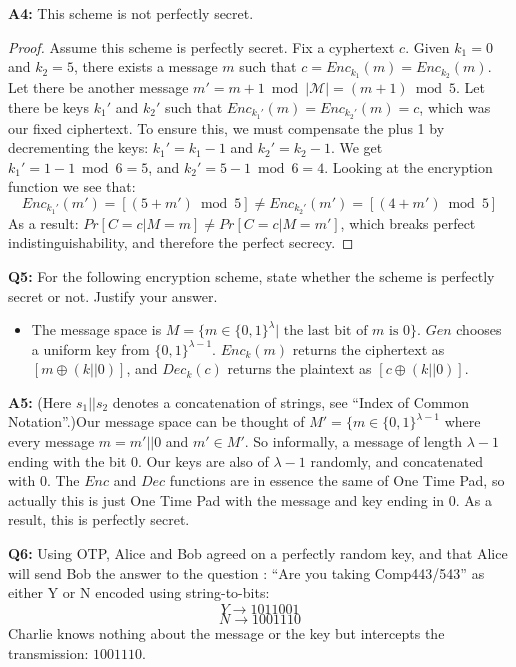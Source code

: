 \documentclass[12pt,reqno]{amsart}
\begin{document}
\textbf{A4:} This scheme is not perfectly secret.
\begin{proof}
Assume this scheme is perfectly secret. Fix a cyphertext $c$. Given $k_1=0$ and $k_2=5$, there exists a message $m$ such that $c=Enc_{k_1}(m)=Enc_{k_2}(m)$. Let there be another message $m' = m + 1 \bmod |\mathcal{M}| = (m+1) \bmod 5$. Let there be keys $k_1'$ and $k_2'$ such that $Enc_{k_1'}(m)=Enc_{k_2'}(m)=c$, which was our fixed ciphertext. To ensure this, we must compensate the plus 1 by decrementing the keys: $k_1'=k_1-1$ and $k_2'=k_2-1$. We get $k_1'=1-1 \bmod 6 = 5$, and $k_2'=5-1 \bmod 6 = 4$. Looking at the encryption function we see that:
$$
Enc_{k_1'}(m')=[(5+m') \bmod 5] \ne Enc_{k_2'}(m') = [(4 + m') \bmod 5]
$$
As a result: $Pr[C=c|M=m] \ne Pr[C=c|M=m']$, which breaks perfect indistinguishability, and therefore the perfect secrecy.
\end{proof}

\vspace{20px}
\textbf{Q5:}   For the following encryption scheme, state whether the scheme is perfectly secret  or  not. Justify your answer.
\begin{itemize}
\item The message space is $M = \{m \in \{0, 1\}^{\lambda} |  \text{ the last bit of $m$ is 0}\}$. $Gen$ chooses a uniform key from $\{0, 1\}^{\lambda-1}$. $Enc_k(m)$ returns the ciphertext as $[m \oplus (k || 0) ]$, and $Dec_k(c)$ returns the plaintext as     $[c \oplus (k||0)]$. 
\end{itemize}
\textbf{A5:} (Here $s_1||s_2$ denotes a concatenation of strings, see ``Index of Common Notation''.)Our message space can be thought of $M'= \{m \in \{0, 1\}^{\lambda-1}$ where every message $m = m'||0$ and $m' \in M'$. So informally, a message of length $\lambda-1$ ending with the bit 0. Our keys are also of $\lambda-1$ randomly, and concatenated with 0. The $Enc$ and $Dec$ functions are in essence the same of One Time Pad, so actually this is just One Time Pad with the message and key ending in 0. As a result, this is perfectly secret.

\vspace{20px}
\textbf{Q6:} Using OTP, Alice   and   Bob   agreed   on   a   perfectly   random   key,  and that Alice will send Bob the answer to the question : ``Are you taking Comp443/543'' as either Y   or N encoded using string-to-bits:
$$
Y \xrightarrow{} 1011001
$$
$$
N \xrightarrow{} 1001110
$$
Charlie knows nothing about the message or the key but intercepts the transmission: $1001110$. 
\end{document}
